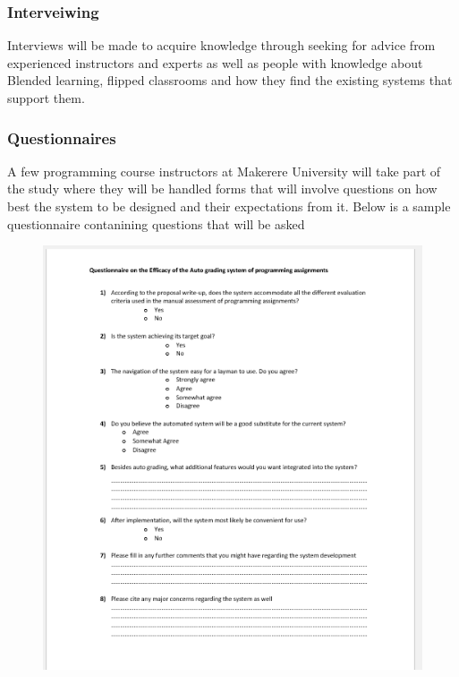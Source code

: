 \documentclass[12pt]{article}
\begin{document}
		\subsubsection{Interveiwing}
			Interviews will be made to acquire knowledge through seeking for advice from experienced instructors and experts as well as people with knowledge about Blended learning, flipped classrooms and how they find the existing systems that support them.
		\subsubsection{Questionnaires}
			A few programming course instructors at Makerere University will take part of the study where they will be handled forms that will involve questions on how best the system to be designed and their expectations from it.
			Below is a sample questionnaire contanining questions that will be asked 
			
			\begin{figure}[H]
				\begin{center} \includegraphics[width=1\linewidth]{qa.PNG} \end{center}
			\end{figure}		 
	
\end{document}
